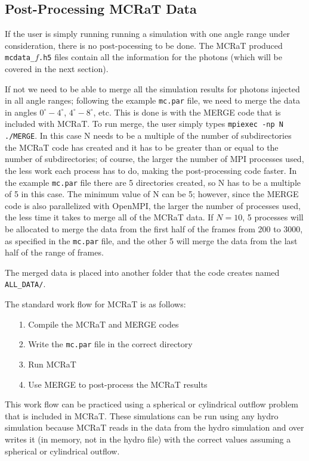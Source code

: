 \documentclass[12pt,a4paper]{article}
\begin{document}
 \subsection{Post-Processing MCRaT Data}
 If the user is simply running running a simulation with one angle range under consideration, there is no post-pocessing to be done. The MCRaT produced \texttt{mcdata\_$f$.h5} files contain all the information for the photons (which will be covered in the next section).
 
 If not we need to be able to merge all the simulation results for photons injected in all angle ranges; following the example \texttt{mc.par} file, we need to merge the data in angles $0^\circ-4^\circ$, $4^\circ-8^\circ$, etc. This is done is with the MERGE code that is included with MCRaT. To run merge, the user simply types \texttt{mpiexec -np N ./MERGE}. In this case N needs to be a multiple of the number of subdirectories the MCRaT code has created and it has to be greater than or equal to the number of subdirectories; of course, the larger the number of MPI processes used, the less work each process has to do, making the post-processing code faster. In the example \texttt{mc.par} file there are 5 directories created, so N has to be a multiple of 5 in this case. The minimum value of N can be 5; however, since the MERGE code is also parallelized with OpenMPI, the larger the number of processes used, the less time it takes to merge all of the MCRaT data.  If $N=10$, 5 processes will be allocated to merge the data from the first half of the frames from 200 to 3000, as specified in the \texttt{mc.par} file, and the other 5 will merge the data from the last half of the range of frames.
 
 The merged data is placed into another folder that the code creates named \texttt{ALL\_DATA/}. \newline
 
 \noindent The standard work flow for MCRaT is as follows:
 \begin{itemize}
 \item[1.] Compile the MCRaT and MERGE codes
 \item[2.] Write the \texttt{mc.par} file in the correct directory
 \item[3.] Run MCRaT
 \item[4.] Use MERGE to post-process the MCRaT results
 \end{itemize}
 
 This work flow can be practiced using a spherical or cylindrical outflow problem that is included in MCRaT. These simulations can be run using any hydro simulation because MCRaT reads in the data from the hydro simulation and over writes it (in memory, not in the hydro file) with the correct values assuming a spherical or cylindrical outflow.
 
\end{document}
